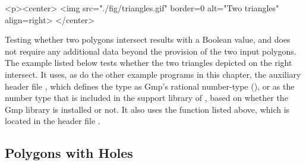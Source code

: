 \lcTex{%
  \vspace{-20pt}
  \setlength{\BooleanSetOpsWidthRight}{1.4cm}
  \setlength{\BooleanSetOpsWidthLeft}{\BooleanSetOpsWidthLineReal}
  \addtolength{\BooleanSetOpsWidthLeft}{-\BooleanSetOpsWidthRight}
  \begin{minipage}{\BooleanSetOpsWidthLeft}
}
\label{fig:example}
\begin{ccHtmlOnly}
  <p><center>
    <img src="./fig/triangles.gif" border=0 alt="Two triangles" align=right>
  </center>
\end{ccHtmlOnly}
Testing whether two polygons intersect results with a Boolean value, 
and does not require any additional data beyond the provision of the 
two input polygons. The example listed below tests whether the two
triangles depicted on the right intersect. It uses, as do the other
example programs in this chapter, the auxiliary header file
, which defines the type  as
{\sc Gmp}'s rational number-type (), or as the
number type  that is included in the support
library of \cgal, based on whether the {\sc Gmp} library is installed
or not. It also uses the function  listed above,
which is located in the header file .

\lcTex{\vspace{-20pt}}

\subsection{Polygons with Holes\label{bso_ssec:polygons_with_holes}}

